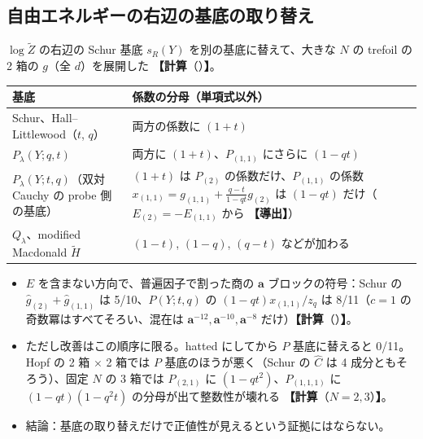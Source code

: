 \documentclass[a4paper,10pt]{ltjsarticle}
\newcommand{\ba}{\bm{a}}
\newcommand{\deriv}{\textbf{【導出】}}
\newcommand{\comp}[1]{\textbf{【計算}\if\relax\detokenize{#1}\relax\else（#1）\fi\textbf{】}}
\begin{document}
\subsection{自由エネルギーの右辺の基底の取り替え}
$\log\tilde Z$ の右辺の Schur 基底 $s_R(Y)$ を別の基底に替えて、大きな $N$ の trefoil の 2 箱の $g$（全 $d$）を展開した \comp{}。
\begin{center}
\begin{tabular}{p{4.6cm}p{10.4cm}}
\toprule
基底 & 係数の分母（単項式以外） \\
\midrule
Schur、Hall--Littlewood（$t$, $q$） & 両方の係数に $(1+t)$ \\
$P_\lambda(Y; q,t)$ & 両方に $(1+t)$、$P_{(1,1)}$ にさらに $(1 - qt)$ \\
$P_\lambda(Y; t,q)$（双対 Cauchy の probe 側の基底） & $(1+t)$ は $P_{(2)}$ の係数だけ、$P_{(1,1)}$ の係数 $x_{(1,1)} = g_{(1,1)} + \frac{q-t}{1-qt}g_{(2)}$ は $(1-qt)$ だけ（$E_{(2)} = -E_{(1,1)}$ から \deriv） \\
$Q_\lambda$、modified Macdonald $\tilde H$ & $(1-t)$, $(1-q)$, $(q-t)$ などが加わる \\
\bottomrule
\end{tabular}
\end{center}
\begin{itemize}
\item $E$ を含まない方向で、普遍因子で割った商の $\ba$ ブロックの符号：Schur の $\hat g_{(2)}+\hat g_{(1,1)}$ は 5/10、$P(Y;t,q)$ の $(1-qt)x_{(1,1)}/z_q$ は 8/11（$c = 1$ の奇数冪はすべてそろい、混在は $\ba^{-12}, \ba^{-10}, \ba^{-8}$ だけ）\comp{}。
\item ただし改善はこの順序に限る。hatted にしてから $P$ 基底に替えると 0/11。Hopf の 2 箱 $\times$ 2 箱では $P$ 基底のほうが悪く（Schur の $\hat C$ は 4 成分ともそろう）、固定 $N$ の 3 箱では $P_{(2,1)}$ に $(1 - qt^2)$、$P_{(1,1,1)}$ に $(1-qt)(1-q^2t)$ の分母が出て整数性が壊れる \comp{$N = 2, 3$}。
\item 結論：基底の取り替えだけで正値性が見えるという証拠にはならない。
\end{itemize}
\end{document}
